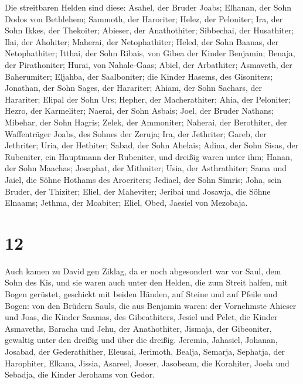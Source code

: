  Die streitbaren Helden sind diese: Asahel, der Bruder
Joabs; Elhanan, der Sohn Dodos von Bethlehem;  Sammoth, der
Haroriter; Helez, der Peloniter;  Ira, der Sohn Ikkes, der
Thekoiter; Abieser, der Anathothiter;  Sibbechai, der
Husathiter; Ilai, der Ahohiter;  Maherai, der
Netophathiter; Heled, der Sohn Baanas, der Netophathiter; 
Itthai, der Sohn Ribais, von Gibea der Kinder Benjamin; Benaja, der
Pirathoniter;  Hurai, von Nahale-Gaas; Abiel, der
Arbathiter;  Asmaveth, der Baherumiter; Eljahba, der
Saalboniter;  die Kinder Hasems, des Gisoniters; Jonathan,
der Sohn Sages, der Harariter;  Ahiam, der Sohn Sachars,
der Harariter; Elipal der Sohn Urs;  Hepher, der
Macherathiter; Ahia, der Peloniter;  Hezro, der Karmeliter;
Naerai, der Sohn Asbais;  Joel, der Bruder Nathans;
Mibehar, der Sohn Hagris;  Zelek, der Ammoniter; Naherai,
der Berothiter, der Waffenträger Joabs, des Sohnes der Zeruja;
 Ira, der Jethriter; Gareb, der Jethriter; 
Uria, der Hethiter; Sabad, der Sohn Ahelais;  Adina, der
Sohn Sisas, der Rubeniter, ein Hauptmann der Rubeniter, und dreißig
waren unter ihm;  Hanan, der Sohn Maachas; Josaphat, der
Mithniter;  Usia, der Asthrathiter; Sama und Jaiel, die
Söhne Hothams des Aroeriters;  Jediael, der Sohn Simris;
Joha, sein Bruder, der Thiziter;  Eliel, der Maheviter;
Jeribai und Josawja, die Söhne Elnaams; Jethma, der Moabiter;
 Eliel, Obed, Jaesiel von Mezobaja.

\hypertarget{section-11}{%
\section{12}\label{section-11}}

 Auch kamen zu David gen Ziklag, da er noch abgesondert war
vor Saul, dem Sohn des Kis, und sie waren auch unter den Helden, die zum
Streit halfen,  mit Bogen gerüstet, geschickt mit beiden
Händen, auf Steine und auf Pfeile und Bogen: von den Brüdern Sauls, die
aus Benjamin waren:  der Vornehmste Ahieser und Joas, die
Kinder Saamas, des Gibeathiters, Jesiel und Pelet, die Kinder Asmaveths,
Baracha und Jehu, der Anathothiter,  Jismaja, der
Gibeoniter, gewaltig unter den dreißig und über die dreißig. Jeremia,
Jahasiel, Johanan, Josabad, der Gederathither,  Eleusai,
Jerimoth, Bealja, Semarja, Sephatja, der Harophiter, 
Elkana, Jissia, Asareel, Joeser, Jasobeam, die Korahiter, 
Joela und Sebadja, die Kinder Jerohams von Gedor.

